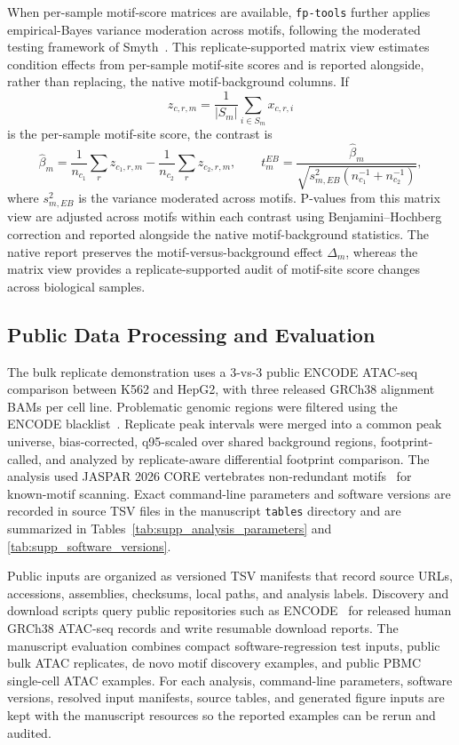 \documentclass[biomedinformatics,article,submit,pdftex,moreauthors]{Definitions/mdpi}
\begin{document}
When per-sample motif-score matrices are available, \texttt{fp-tools} further
applies empirical-Bayes variance moderation across motifs, following the
moderated testing framework of Smyth~\cite{smyth2004}. This
replicate-supported matrix view estimates condition effects from per-sample
motif-site scores and is reported alongside, rather than replacing, the native
motif-background columns. If
\[
z_{c,r,m}=\frac{1}{|S_m|}\sum_{i\in S_m}x_{c,r,i}
\]
is the per-sample motif-site score, the contrast is
\[
\hat{\beta}_m=\frac{1}{n_{c_1}}\sum_r z_{c_1,r,m}
-
\frac{1}{n_{c_2}}\sum_r z_{c_2,r,m},
\qquad
t^{EB}_m=\frac{\hat{\beta}_m}
{\sqrt{s^2_{m,EB}\left(n_{c_1}^{-1}+n_{c_2}^{-1}\right)}} ,
\]
where $s^2_{m,EB}$ is the variance moderated across motifs. P-values from this
matrix view are adjusted across motifs within each contrast using
Benjamini--Hochberg correction and reported alongside the native
motif-background statistics. The native report preserves the
motif-versus-background effect $\Delta_m$, whereas the matrix view provides a
replicate-supported audit of motif-site score changes across biological samples.

\subsection{Public Data Processing and Evaluation}
\label{sec:processing_provenance}

The bulk replicate demonstration uses a 3-vs-3 public ENCODE ATAC-seq
comparison between K562 and HepG2, with three released GRCh38 alignment BAMs per
cell line. Problematic genomic regions were filtered using the ENCODE
blacklist~\cite{Amemiya2019_Blacklist}.
Replicate peak intervals were merged into a common peak universe, bias-corrected,
q95-scaled over shared background regions, footprint-called, and analyzed by
replicate-aware differential footprint comparison. The analysis used JASPAR 2026
CORE vertebrates non-redundant motifs~\cite{jaspar2026} for known-motif
scanning. Exact command-line parameters and software versions are recorded in
source TSV files in the manuscript \texttt{tables} directory and are summarized in
Tables~\ref{tab:supp_analysis_parameters} and
\ref{tab:supp_software_versions}.

Public inputs are organized as versioned TSV manifests that record source URLs,
accessions, assemblies, checksums, local paths, and analysis labels. Discovery
and download scripts query public repositories such as ENCODE~\cite{encode2012}
for released human GRCh38 ATAC-seq records and write resumable download reports.
The manuscript evaluation combines compact software-regression test inputs,
public bulk ATAC replicates, de novo motif discovery examples, and public PBMC
single-cell ATAC examples. For each analysis, command-line parameters, software
versions, resolved input manifests, source tables, and generated figure inputs
are kept with the manuscript resources so the reported examples can be rerun and
audited.
\end{document}
